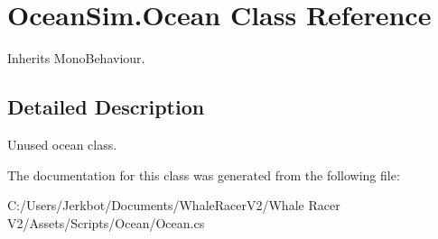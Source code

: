 \hypertarget{class_ocean_sim_1_1_ocean}{}\section{Ocean\+Sim.\+Ocean Class Reference}
\label{class_ocean_sim_1_1_ocean}


Inherits Mono\+Behaviour.



\subsection{Detailed Description}
Unused ocean class. 



The documentation for this class was generated from the following file\+:\begin{DoxyCompactItemize}
\item 
C\+:/\+Users/\+Jerkbot/\+Documents/\+Whale\+Racer\+V2/\+Whale Racer V2/\+Assets/\+Scripts/\+Ocean/Ocean.\+cs\end{DoxyCompactItemize}
